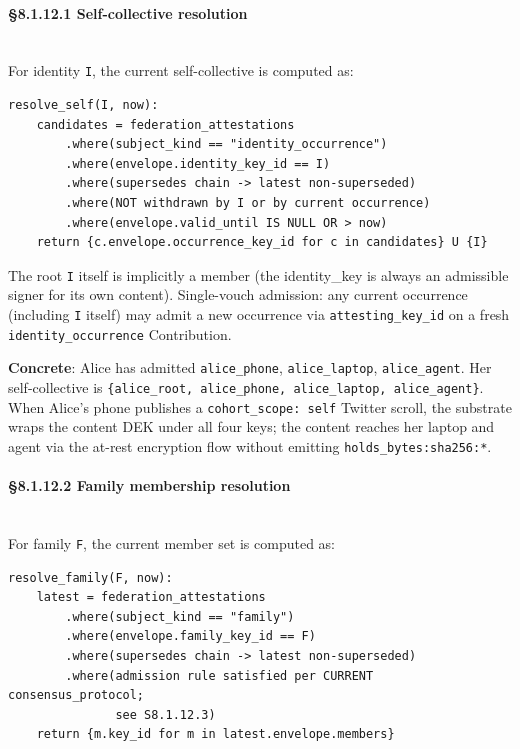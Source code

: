 \documentclass[11pt]{article}
\begin{document}
\paragraph{§8.1.12.1 Self-collective resolution}\mbox{}\\


For identity \texttt{I}, the current self-collective is computed as:


\begin{lstlisting}
resolve_self(I, now):
    candidates = federation_attestations
        .where(subject_kind == "identity_occurrence")
        .where(envelope.identity_key_id == I)
        .where(supersedes chain -> latest non-superseded)
        .where(NOT withdrawn by I or by current occurrence)
        .where(envelope.valid_until IS NULL OR > now)
    return {c.envelope.occurrence_key_id for c in candidates} U {I}
\end{lstlisting}

The root \texttt{I} itself is implicitly a member (the identity\_key is always an admissible signer for its own content). Single-vouch admission: any current occurrence (including \texttt{I} itself) may admit a new occurrence via \texttt{attesting\_key\_id} on a fresh \texttt{identity\_occurrence} Contribution.


\textbf{Concrete}: Alice has admitted \texttt{alice\_phone}, \texttt{alice\_laptop}, \texttt{alice\_agent}. Her self-collective is \texttt{\{alice\_root, alice\_phone, alice\_laptop, alice\_agent\}}. When Alice's phone publishes a \texttt{cohort\_scope: self} Twitter scroll, the substrate wraps the content DEK under all four keys; the content reaches her laptop and agent via the at-rest encryption flow without emitting \texttt{holds\_bytes:sha256:*}.


\paragraph{§8.1.12.2 Family membership resolution}\mbox{}\\


For family \texttt{F}, the current member set is computed as:


\begin{lstlisting}
resolve_family(F, now):
    latest = federation_attestations
        .where(subject_kind == "family")
        .where(envelope.family_key_id == F)
        .where(supersedes chain -> latest non-superseded)
        .where(admission rule satisfied per CURRENT consensus_protocol;
               see S8.1.12.3)
    return {m.key_id for m in latest.envelope.members}
\end{lstlisting}
\end{document}
